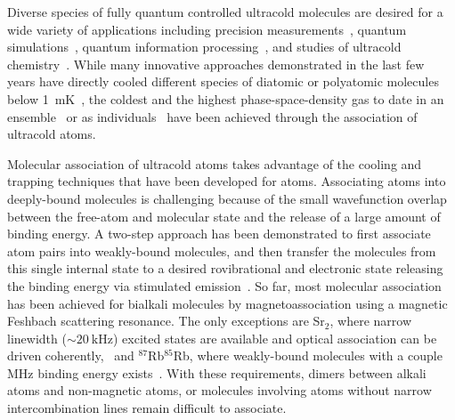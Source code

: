 \documentclass[aps,prl,twocolumn,10pt,superscriptaddress]{revtex4-1}
\begin{document}

Diverse species of fully quantum controlled  ultracold molecules are desired for a  wide variety of applications including precision measurements~\cite{Kondov2019,Nick_and_Ivan2017, PhysRevA.101.042504, Andreev2018, PhysRevLett.119.153001, hudson2011}, quantum simulations~\cite{Yao2018, Wall2015, Sundar2018, wall2015realizing}, quantum information processing~\cite{DeMille2002, Ni2018, Hudson2018, Lin2019}, and studies of ultracold chemistry~\cite{Bohn2017,Bala2016,Hu1111,Segev2019}.
While many innovative approaches demonstrated in the last few years have directly cooled different species of diatomic or polyatomic molecules below 1~mK~\cite{Norrgard2016,Anderegg2018, Mitra1366, PhysRevX.10.021049, PhysRevLett.121.013202, PhysRevLett.120.123201}, the coldest and the highest phase-space-density gas to date in an ensemble~\cite{Demarco2018} or as individuals~\cite{Zhang2020,He331}  have been achieved through the association of ultracold atoms.

Molecular association of ultracold atoms takes advantage of the cooling and trapping techniques that have been developed for atoms. Associating atoms into deeply-bound molecules is challenging because of the small wavefunction overlap between the free-atom and molecular state and the release of a large amount of binding energy. A two-step approach has been demonstrated to first associate atom pairs into weakly-bound molecules, and then transfer the molecules from this single internal state to a desired rovibrational and electronic state releasing the binding energy via stimulated emission~\cite{Danzl2008, Ni2008,Lang2008, Takekoshi2014, Molony2014, Park2015, Guo2016, Kondov2019, Voges2020}.
So far, most molecular association has been achieved for bialkali molecules by magnetoassociation using a magnetic Feshbach scattering resonance. The only exceptions are Sr$_2$, where narrow linewidth ($\sim 20~\mathrm{kHz}$) excited states are available and optical association can be driven coherently,~\cite{Reinaudi2012,Stellmer2012} and $^{87}$Rb$^{85}$Rb, where weakly-bound molecules with a couple MHz binding energy exists~\cite{He331}. With these requirements, dimers between alkali atoms and non-magnetic atoms, or molecules involving atoms without narrow intercombination lines remain difficult to associate.
\end{document}
